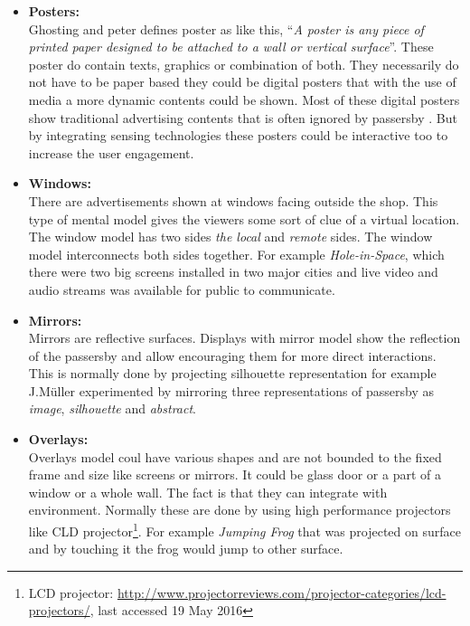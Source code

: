 \begin{itemize}
\item \textbf{Posters: } \\
Ghosting and peter\cite{Poster_Ad} defines poster as like this, ``\emph{A poster is any piece of printed paper designed to be attached to a wall or vertical surface}''. These poster do contain texts, graphics or combination of both. They necessarily do not have to be paper based they could be digital posters that with the use of media a more dynamic contents could be shown. Most of these digital posters show traditional advertising contents that is often ignored by passersby \cite{display_blindness}. But by integrating sensing technologies these posters could be interactive too to increase the user engagement.


\item \textbf{Windows: } \\
There are advertisements shown at windows facing outside the shop. This type of mental model gives the viewers some sort of clue of a virtual location. The window model has two sides \emph{the local} and \emph{remote} sides. The window model interconnects both sides together. For example \emph{Hole-in-Space}\cite{hole_space}, which there were two big screens installed in two major cities and live video and audio streams was available for public to communicate.

\item \textbf{Mirrors: } \\
Mirrors are reflective surfaces. Displays with mirror model show the reflection of the passersby and allow encouraging them for more direct interactions. This is normally done by projecting silhouette representation for example J.Müller \cite{LookingGlass} experimented by mirroring three representations of passersby as \emph{image}, \emph{silhouette} and \emph{abstract}.

\item \textbf{Overlays: } \\
Overlays model coul have various shapes and are not bounded to the fixed frame and size like screens or mirrors. It could be glass door or a part of a window or a whole wall. The fact is that they can integrate with environment. Normally these are done by using high performance projectors like CLD projector\footnote{LCD projector: \url{http://www.projectorreviews.com/projector-categories/lcd-projectors/}, last accessed 19 May 2016}. For example \emph{Jumping Frog} \cite{ meme-tags}that was projected on surface and by touching it the frog would jump to other surface.


\end{itemize}



